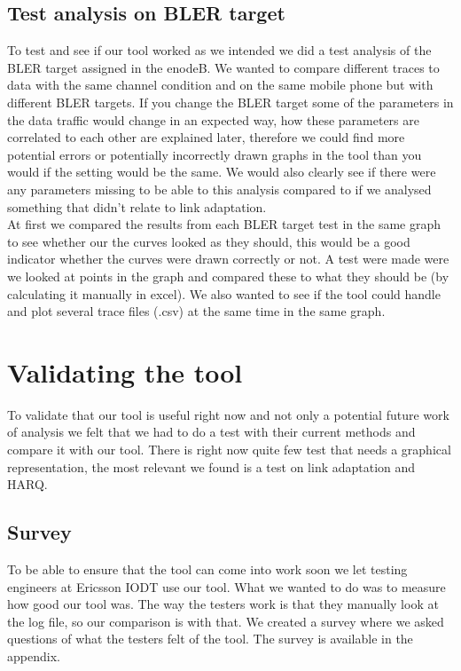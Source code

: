 \documentclass[cropmarks, frame, english]{idamasterthesis}
\begin{document}
\subsection{Test analysis on  BLER target}
To test and see if our tool worked as we intended we did a test analysis of the BLER target assigned in the enodeB. We wanted to compare different traces to data with the same channel condition and on the same mobile phone but with different BLER targets. If you change the BLER target some of the parameters in the data traffic would change in an expected way, how these parameters are correlated to each other are explained later, therefore we could find more potential errors or potentially incorrectly drawn graphs in the tool than you would if the setting would be the same. We would also clearly see if there were any parameters missing to be able to this analysis compared to if we analysed something that didn't relate to link adaptation. \\

At first we compared the results from each BLER target test in the same graph to see whether our the curves looked as they should, this would be a good indicator whether the curves were drawn correctly or not. A test were made were we looked at points in the graph and compared these to what they should be (by calculating it manually in excel). 
We also  wanted to see if the tool could handle and plot several trace files (.csv) at the same time in the same graph.


\section{Validating the tool}

To validate that our tool is useful right now and not only a potential future work of analysis we felt that we had to do a test with their current methods and compare it with our tool. There is right now quite few test that needs a graphical representation, the most relevant we found is a test on link adaptation and HARQ.

\subsection{Survey}
To be able to ensure that the tool can come into work soon we let testing engineers at Ericsson IODT use our tool. What we wanted to do was to measure how good our tool was. The way the testers work is that they manually look at the log file, so our comparison is with that. We created a survey where we asked questions of what the testers felt of the tool. The survey is available in the appendix.
\end{document}
